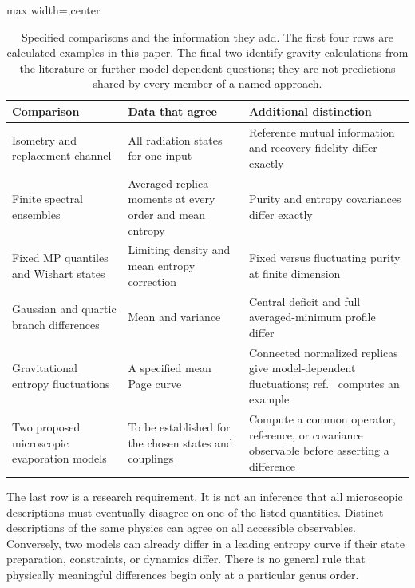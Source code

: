 \documentclass[11pt,letterpaper]{article}
\theoremstyle{plain}
\theoremstyle{definition}
\theoremstyle{remark}
\begin{document}
\begin{table}[tbp]
\centering
\caption{Specified comparisons and the information they add. The first
four rows are calculated examples in this paper. The final two identify
gravity calculations from the literature or further model-dependent
questions; they are not predictions shared by every member of a named
approach.}
\label{tab07:comparisons}
\begin{adjustbox}{max width=\textwidth,center}
\begin{tabular}{p{}p{}p{}}
\toprule
Comparison & Data that agree & Additional distinction \\
\midrule
Isometry and replacement channel & All radiation states for one input
& Reference mutual information and recovery fidelity differ exactly \\[4pt]
Finite spectral ensembles & Averaged replica moments at every order
and mean entropy & Purity and entropy covariances differ exactly \\[4pt]
Fixed MP quantiles and Wishart states & Limiting density and mean
entropy correction & Fixed versus fluctuating purity at finite dimension \\[4pt]
Gaussian and quartic branch differences & Mean and variance & Central
deficit and full averaged-minimum profile differ \\[4pt]
Gravitational entropy fluctuations & A specified mean Page curve
& Connected normalized replicas give model-dependent fluctuations;
ref.~\cite{boussomiyaji2024} computes an example \\[4pt]
Two proposed microscopic evaporation models & To be established for the
chosen states and couplings & Compute a common operator, reference, or
covariance observable before asserting a difference \\
\bottomrule
\end{tabular}
\end{adjustbox}
\end{table}

The last row is a research requirement. It is not an inference that all
microscopic descriptions must eventually disagree on one of the listed
quantities. Distinct descriptions of the same physics can agree on all
accessible observables. Conversely, two models can already differ in a
leading entropy curve if their state preparation, constraints, or
dynamics differ. There is no general rule that physically meaningful
differences begin only at a particular genus order.
\end{document}
